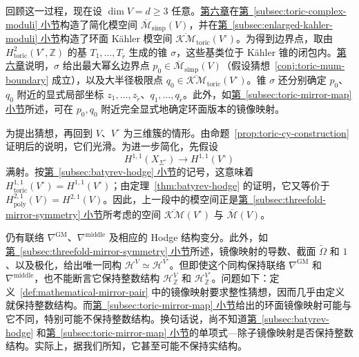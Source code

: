 回顾这一过程，现在设 $\dim V=d\ge3$ 任意。\hyperref[chap:moduli]{第六章}在\hyperref[subsec:toric-complex-moduli]{第~\ref*{subsec:toric-complex-moduli} 小节}构造了简化模空间 $\overline{\mathcal M}_{\mathrm{simp}}(V)$，并在\hyperref[subsec:enlarged-kahler-moduli]{第~\ref*{subsec:enlarged-kahler-moduli} 小节}构造了环面 Kähler 模空间 $\overline{\mathcal{KM}}_{\mathrm{toric}}(V^\circ)$。为得到边界点，取由 $H^2_{\mathrm{toric}}(V^\circ,\mathbb Z)$ 的基 $T_1,\ldots,T_{\widetilde r}$ 生成的锥 $\sigma$，这些基类位于 Kähler 锥的闭包内。\hyperref[chap:moduli]{第六章}说明，$\sigma$ 给出最大幂幺边界点 $p_0\in\overline{\mathcal M}_{\mathrm{simp}}(V)$（假设猜想~\ref{conj:toric-mum-boundary} 成立），以及大半径极限点 $q_0\in\overline{\mathcal{KM}}_{\mathrm{toric}}(V^\circ)$。锥 $\sigma$ 还分别确定 $p_0$、$q_0$ 附近的显式局部坐标 $z_1,\ldots,z_{\widetilde r}$、$q_1,\ldots,q_{\widetilde r}$。此外，如\hyperref[subsec:toric-mirror-map]{第~\ref*{subsec:toric-mirror-map} 小节}所述，可在 $p_0,q_0$ 附近完全显式地确定环面版本的镜像映射。

为提出猜想，再回到 $V$、$V^\circ$ 为三维簇的情形。由命题~\ref{prop:toric-cy-construction} 证明后的说明，它们光滑。为进一步简化，先假设
\begin{equation}\label{eq:toric-divisor-surjectivity}
H^{1,1}(X_{\Sigma^\circ})\longrightarrow H^{1,1}(V^\circ)
\end{equation}
满射。按\hyperref[subsec:batyrev-hodge]{第~\ref*{subsec:batyrev-hodge} 小节}的记号，这意味着 $H^{1,1}_{\mathrm{toric}}(V^\circ)=H^{1,1}(V^\circ)$；由定理~\ref{thm:batyrev-hodge} 的证明，它又等价于 $H^{2,1}_{\mathrm{poly}}(V)=H^{2,1}(V)$。因此，上一段中的模空间正是\hyperref[subsec:threefold-mirror-symmetry]{第~\ref*{subsec:threefold-mirror-symmetry} 小节}所考虑的空间 $\overline{\mathcal{KM}}(V^\circ)$ 与 $\overline{\mathcal M}(V)$。

仍有联络 $\nabla^{\mathrm{GM}}$、$\nabla^{\mathrm{middle}}$ 及相应的 Hodge 结构变分。此外，如\hyperref[subsec:threefold-mirror-symmetry]{第~\ref*{subsec:threefold-mirror-symmetry} 小节}所述，镜像映射的导数、截面 $\widetilde\Omega$ 和 $1$、以及极化，给出唯一同构 $\mathcal H^V\simeq\mathcal H^{V^\circ}$。但即使这个同构保持联络 $\nabla^{\mathrm{GM}}$
和 $\nabla^{\mathrm{middle}}$，也不能断言它保持整数结构 $\mathcal H^V_{\mathbb Z}$ 和 $\mathcal H^{V^\circ}_{\mathbb Z}$。问题如下：定义~\ref{def:mathematical-mirror-pair} 中的镜像映射要求整性猜想，因而几乎由定义就保持整数结构。而\hyperref[subsec:toric-mirror-map]{第~\ref*{subsec:toric-mirror-map} 小节}给出的环面镜像映射可能与它不同，特别可能不保持整数结构。换句话说，尚不知道\hyperref[subsec:batyrev-hodge]{第~\ref*{subsec:batyrev-hodge}} 和\hyperref[subsec:toric-mirror-map]{第~\ref*{subsec:toric-mirror-map} 小节}的单项式—除子镜像映射是否保持整数结构。实际上，据我们所知，它甚至可能不保持实结构。

